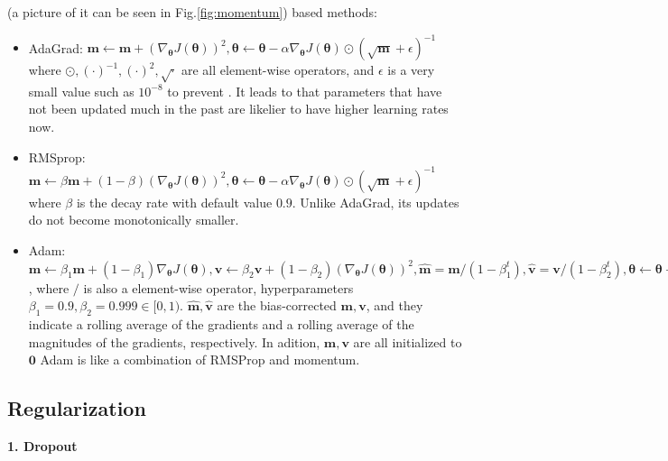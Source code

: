  (a picture of it can be seen in Fig.\ref{fig:momentum}) based methods:
\begin{itemize}
	\item AdaGrad: $\bm{m} \leftarrow \bm{m} + \left(\nabla_{\bm{\theta}} J (\bm{\theta})\right)^2, \bm{\theta} \leftarrow \bm{\theta} - \alpha \nabla_{\bm{\theta}} J (\bm{\theta}) \odot \left(\sqrt{\bm{m}} + \epsilon\right)^{-1}$ where $\odot, (\cdot)^{-1}, (\cdot)^{2}, \sqrt{\cdot}$ are all element-wise operators, and $\epsilon$ is a very small value such as $10^{-8}$ to prevent .
	It leads to that parameters that have not been updated much in the past are likelier to have higher learning rates now.
	\item RMSprop: $\bm{m} \leftarrow \beta \bm{m} + (1-\beta) \left(\nabla_{\bm{\theta}} J (\bm{\theta})\right)^2, \bm{\theta} \leftarrow \bm{\theta} - \alpha \nabla_{\bm{\theta}} J (\bm{\theta}) \odot \left(\sqrt{\bm{m}} + \epsilon\right)^{-1}$ where $\beta$ is the decay rate with default value $0.9$. Unlike AdaGrad, its updates do not become monotonically smaller.
	\item Adam: $\bm{m} \leftarrow \beta_1 \bm{m} + (1-\beta_1) \nabla_{\bm{\theta}} J (\bm{\theta}), \bm{v} \leftarrow \beta_2 \bm{v} + (1-\beta_2) \left(\nabla_{\bm{\theta}} J (\bm{\theta})\right)^2, \hat{\bm{m}} = \bm{m} / (1 - \beta_1^t), \hat{\bm{v}} = \bm{v} / (1 - \beta_2^t), \bm{\theta} \leftarrow \bm{\theta} - \alpha \hat{\bm{m}} /  \left(\sqrt{\hat{\bm{v}}} + \epsilon\right)$, where $/$ is also a element-wise operator, hyperparameters $\beta_1 = 0.9, \beta_2 = 0.999 \in [0, 1)$. $\hat{\bm{m}}, \hat{\bm{v}}$ are the bias-corrected $\bm{m}, \bm{v}$, and they indicate a rolling average
	of the gradients and a rolling average of the magnitudes of the gradients, respectively. In adition, $\bm{m}, \bm{v}$ are all initialized to $\bm{0}$ Adam is like a combination of RMSProp and momentum.
\end{itemize}


\subsection{Regularization}
\textbf{1. Dropout}

